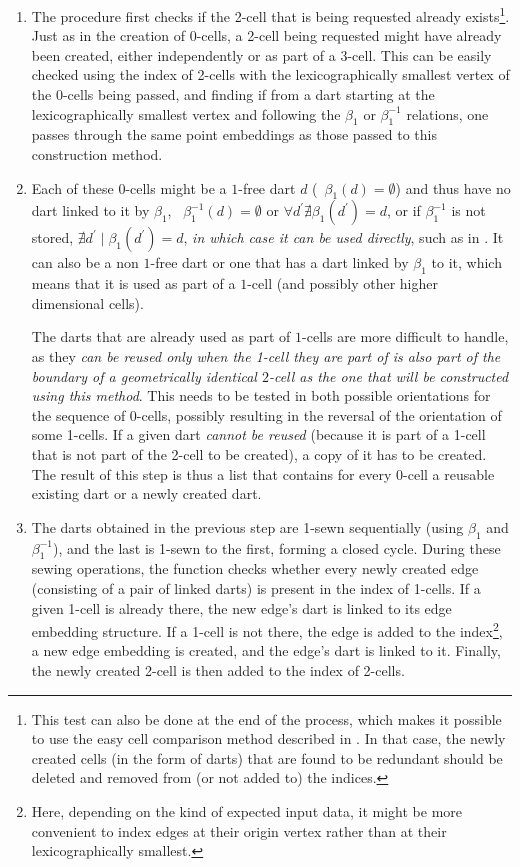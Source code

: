 \begin{enumerate}

\item
The procedure first checks if the 2-cell that is being requested already exists\footnote{This test can also be done at the end of the process, which makes it possible to use the easy cell comparison method described in .
In that case, the newly created cells (in the form of darts) that are found to be redundant should be deleted and removed from (or not added to) the indices.}.
Just as in the creation of 0-cells, a 2-cell being requested might have already been created, either independently or as part of a 3-cell.
This can be easily checked using the index of 2-cells with the lexicographically smallest vertex of the 0-cells being passed, and finding if from a dart starting at the lexicographically smallest vertex and following the $\beta_1$ or $\beta_1^{-1}$ relations, one passes through the same point embeddings as those passed to this construction method.

\item
Each of these 0-cells might be a $1$-free dart $d$ (\ie\ $\beta_1(d) = \emptyset$) and thus have no dart linked to it by $\beta_1$, \ie\ $\beta_1^{-1}(d) = \emptyset$ or $\forall d^\prime \nexists \beta_1(d^\prime) = d$, or if $\beta_1^{-1}$ is not stored, $\nexists d^\prime \mid \beta_1(d^\prime) = d$, \emph{in which case it can be used directly}, such as in .
It can also be a non $1$-free dart or one that has a dart linked by $\beta_1$ to it, which means that it is used as part of a $1$-cell (and possibly other higher dimensional cells).

The darts that are already used as part of $1$-cells are more difficult to handle, as they \emph{can be reused only when the 1-cell they are part of is also part of the boundary of a geometrically identical $2$-cell as the one that will be constructed using this method}.
This needs to be tested in both possible orientations for the sequence of 0-cells, possibly resulting in the reversal of the orientation of some 1-cells.
If a given dart \emph{cannot be reused} (because it is part of a 1-cell that is not part of the 2-cell to be created), a copy of it has to be created.
The result of this step is thus a list that contains for every 0-cell a reusable existing dart or a newly created dart.

\item
The darts obtained in the previous step are 1-sewn sequentially (using $\beta_1$ and $\beta_1^{-1}$), and the last is 1-sewn to the first, forming a closed cycle.
During these sewing operations, the function checks whether every newly created edge (consisting of a pair of linked darts) is present in the index of 1-cells.
If a given 1-cell is already there, the new edge's dart is linked to its edge embedding structure.
If a 1-cell is not there, the edge is added to the index\footnote{Here, depending on the kind of expected input data, it might be more convenient to index edges at their origin vertex rather than at their lexicographically smallest.}, a new edge embedding is created, and the edge's dart is linked to it.
Finally, the newly created 2-cell is then added to the index of 2-cells.


\end{enumerate}

